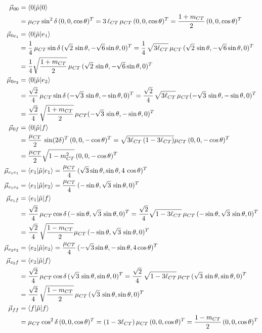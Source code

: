 \documentclass[journal=jpcafh]{achemso}
\begin{document}
\begin{align}
	\vec\mu_{00} &= \braket{0|\hat{\mu}|0} \nonumber\\
	&= \mu_{CT}\sin^2\delta\,(0,0,\cos\theta)^T 
	= 3\,\ell_{CT}\,\mu_{CT}\,(0,0,\cos\theta)^T
	= \frac{1+m_{CT}}{2}\,(0,0,\cos\theta)^T\\
	\vec\mu_{0e_1} &= \braket{0|\hat{\mu}|e_1}  \nonumber\\
	&= \frac{1}{4}\,\mu_{CT}\sin\delta\,(\sqrt{2}\,\sin\theta, -\sqrt{6}\sin\theta, 0)^T = \frac{1}{4}\,\sqrt{3\ell_{CT}}\,\mu_{CT}\,(\sqrt{2}\,\sin\theta, -\sqrt{6}\sin\theta, 0)^T \nonumber\\
	&= \frac{1}{4}\sqrt{\frac{1+m_{CT}}{2}}\,\mu_{CT}\,(\sqrt{2}\,\sin\theta, -\sqrt{6}\sin\theta, 0)^T\\
	\vec\mu_{0e_2} &= \braket{0|\hat{\mu}|e_2} \nonumber\\
	&= \frac{\sqrt{2}}{4}\,\mu_{CT}\sin\delta\,(-\sqrt{3}\,\sin\theta, -\sin\theta, 0)^T= \frac{\sqrt{2}}{4}\,\sqrt{3\ell_{CT}}\,\mu_{CT}(-\sqrt{3}\,\sin\theta, -\sin\theta, 0)^T\nonumber\\
	&= \frac{\sqrt{2}}{4}\,\sqrt{\frac{1+m_{CT}}{2}}\,\mu_{CT}(-\sqrt{3}\,\sin\theta, -\sin\theta, 0)^T\\
	\vec\mu_{0f} &= \braket{0|\hat{\mu}|f} \nonumber\\
	&= \frac{\mu_{CT}}{2}\,\sin(2\delta)^T\,(0,0,-\cos\theta)^T
	=\sqrt{3\ell_{CT}\,(1- 3\ell_{CT})}\mu_{CT}\,(0,0,-\cos\theta)^T \nonumber\\
	&=\frac{\mu_{CT}}{2}\sqrt{1-m_{CT}^2}\,(0,0,-\cos\theta)^T\\
	\vec\mu_{e_1e_1} &= \braket{e_1|\hat{\mu}|e_1} 
	= \frac{\mu_{CT}}{4}\,(\sqrt{3}\sin\theta,\sin\theta,4\,\cos\theta)^T\\
	\vec\mu_{e_1e_2} &= \braket{e_1|\hat{\mu}|e_2} 
	= \frac{ \mu_{CT}}{4}\,(-\sin\theta, \sqrt{3}\,\sin\theta, 0)^T\\
	\vec\mu_{e_1f} &= \braket{e_1|\hat{\mu}|f} \nonumber\\
	&= \frac{\sqrt{2}}{4}\, \mu_{CT}\cos\delta\,(-\sin\theta, \sqrt{3}\,\sin\theta, 0)^T 
	= \frac{\sqrt{2}}{4}\sqrt{1-3\ell_{CT}}\, \mu_{CT}\,(-\sin\theta, \sqrt{3}\,\sin\theta, 0)^T\nonumber\\
	&= \frac{\sqrt{2}}{4}\,\sqrt{\frac{1-m_{CT}}{2}}\mu_{CT}\,(-\sin\theta, \sqrt{3}\,\sin\theta, 0)^T\\
	\vec\mu_{e_2e_2} &= \braket{e_2|\hat{\mu}|e_2} 
	= \frac{\mu_{CT}}{4}\,(-\sqrt{3}\sin\theta, -\sin\theta, 4\cos\theta)^T\\
	\vec\mu_{e_2f} &= \braket{e_2|\hat{\mu}|f}\nonumber\\
	&= \frac{\sqrt{2}}{4}\,\mu_{CT}\cos\delta\,(\sqrt{3}\,\sin\theta, \sin\theta, 0)^T
	= \frac{\sqrt{2}}{4}\,\sqrt{1-3\ell_{CT}}\,\mu_{CT}\,(\sqrt{3}\,\sin\theta, \sin\theta, 0)^T\nonumber\\
	&= \frac{\sqrt{2}}{4}\,\sqrt{\frac{1-m_{CT}}{2}}\,\mu_{CT}\,(\sqrt{3}\,\sin\theta, \sin\theta, 0)^T\\
	\vec\mu_{ff} &= \braket{f|\hat{\mu}|f} \nonumber\\
	&= \mu_{CT}\cos^2\delta\,(0,0,\cos\theta)^T
	=(1- 3\ell_{CT})\,\mu_{CT}\,(0,0,\cos\theta)^T
	= \frac{1-m_{CT}}{2}\,(0,0,\cos\theta)^T\end{align}
\end{document}
